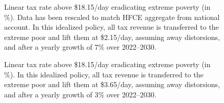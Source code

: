 \documentclass[12pt,english]{article}
\begin{document}
\begin{figure}[!htb]
  \caption[Anti-extreme-poverty tax above \$18.15/day after 7\% growth (HFCE-scaled).]{Linear tax rate above \$18.15/day eradicating extreme poverty (in \%). Data has been rescaled to match HFCE aggregate from national account. In this idealized policy, all tax revenue is transferred to the extreme poor and lift them at \$2.15/day, assuming away distorsions, and after a yearly growth of 7\% over 2022--2030. 
  }\label{fig:s_antipoverty_2_tax_18_very_optimistic}
\end{figure}

\begin{figure}[!htb]
  \caption[Anti-severe-poverty tax above \$18.15/day after 3\% growth (HFCE-scaled).]{Linear tax rate above \$18.15/day eradicating extreme poverty (in \%). In this idealized policy, all tax revenue is transferred to the extreme poor and lift them at \$3.65/day, assuming away distorsions, and after a yearly growth of 3\% over 2022--2030. 
  }\label{fig:antipoverty_4_tax_18_average}
\end{figure}
\end{document}
